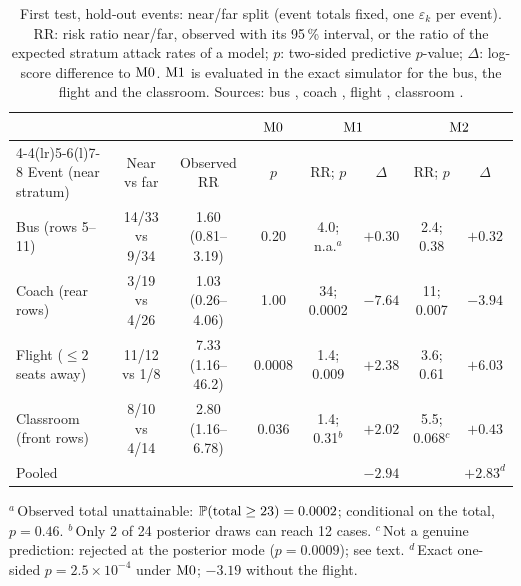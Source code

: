 \begin{table}[tbp]
  \centering\small
  \caption{First test, hold-out events: near/far split (event totals fixed, one $\varepsilon_k$ per event). RR:
  risk ratio near/far, observed with its 95\,\% interval, or the ratio of the expected stratum attack rates of a
  model; $p$: two-sided predictive $p$-value; $\Delta$: log-score difference to $\mathrm{M0}$. $\mathrm{M1}$ is evaluated
  in the exact simulator for the bus, the flight and the classroom. Sources: bus \citep{shen2020}, coach
  \citep{luo2020,ou2022}, flight \citep{khanh2020}, classroom \citep{lamhine2021}.}
  \label{s8_outbreaks:tab:holdout}
  \setlength{\tabcolsep}{3.4pt}
  \begin{tabular}{@{}lccccccc@{}}
    \toprule
    & & & $\mathrm{M0}$ & \multicolumn{2}{c}{$\mathrm{M1}$} & \multicolumn{2}{c}{$\mathrm{M2}$} \\
    \cmidrule(lr){4-4}\cmidrule(lr){5-6}\cmidrule(l){7-8}
    Event (near stratum) & Near vs far & Observed RR & $p$ & RR; $p$ & $\Delta$ & RR; $p$ & $\Delta$ \\
    \midrule
    Bus (rows 5--11)         & 14/33 vs 9/34 & 1.60 (0.81--3.19) & 0.20   & 4.0; n.a.$^{a}$ & $+0.30$ & 2.4; 0.38  & $+0.32$ \\
    Coach (rear rows)        & 3/19 vs 4/26  & 1.03 (0.26--4.06) & 1.00   & 34; 0.0002      & $-7.64$ & 11; 0.007  & $-3.94$ \\
    Flight ($\le2$ seats away) & 11/12 vs 1/8  & 7.33 (1.16--46.2) & 0.0008 & 1.4; 0.009      & $+2.38$ & 3.6; 0.61  & $+6.03$ \\
    Classroom (front rows)   & 8/10 vs 4/14  & 2.80 (1.16--6.78) & 0.036  & 1.4; 0.31$^{b}$ & $+2.02$ & 5.5; 0.068$^{c}$ & $+0.43$ \\
    \midrule
    Pooled & & & & & $-2.94$ & & $+2.83^{d}$ \\
    \bottomrule
  \end{tabular}

  \smallskip
  \begin{minipage}{0.96\textwidth}\footnotesize
  $^{a}$\,Observed total unattainable: $\mathbb{P}(\text{total}\ge23)=0.0002$; conditional on the total, $p=0.46$.
  $^{b}$\,Only 2 of 24 posterior draws can reach 12 cases.
  $^{c}$\,Not a genuine prediction: rejected at the posterior mode ($p=0.0009$); see text.
  $^{d}$\,Exact one-sided $p=2.5\times10^{-4}$ under $\mathrm{M0}$; $-3.19$ without the flight.
  \end{minipage}
\end{table}

